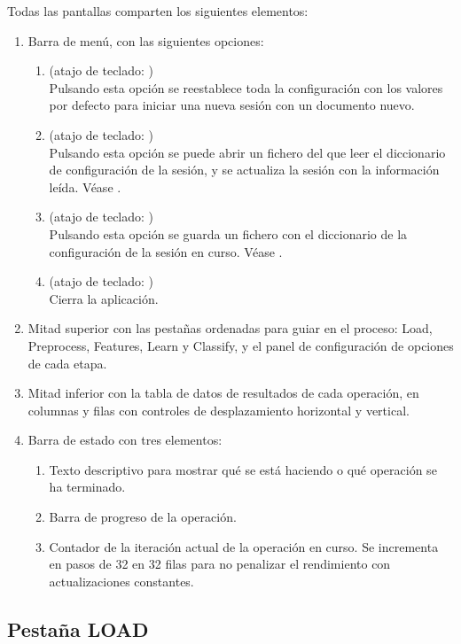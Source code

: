 Todas las pantallas comparten los siguientes elementos:
\begin{enumerate}
\item Barra de menú, con las siguientes opciones:
\begin{enumerate}
\item {} (atajo de teclado: )\\
Pulsando esta opción se reestablece toda la configuración con los valores por defecto para iniciar una nueva sesión con un documento nuevo.
\item {} (atajo de teclado: )\\
Pulsando esta opción se puede abrir un fichero  del que leer el diccionario de configuración de la sesión, y se actualiza la sesión con la información leída. Véase .
\item {} (atajo de teclado: )\\
Pulsando esta opción se guarda un fichero  con el diccionario de la configuración de la sesión en curso. Véase .
\item {} (atajo de teclado: )\\
Cierra la aplicación.
\end{enumerate}
\item Mitad superior con las pestañas ordenadas para guiar en el proceso: Load, Preprocess, Features, Learn y Classify, y el panel de configuración de opciones de cada etapa.
\item Mitad inferior con la tabla de datos de resultados de cada operación, en columnas y filas con controles de desplazamiento horizontal y vertical.
\item Barra de estado con tres elementos:
\begin{enumerate}
\item Texto descriptivo para mostrar qué se está haciendo o qué operación se ha terminado.
\item Barra de progreso de la operación.
\item Contador de la iteración actual de la operación en curso. Se incrementa en pasos de 32 en 32 filas para no penalizar el rendimiento con actualizaciones constantes.
\end{enumerate}
\end{enumerate}

\FloatBarrier
\newpage
\subsection{Pestaña LOAD}

